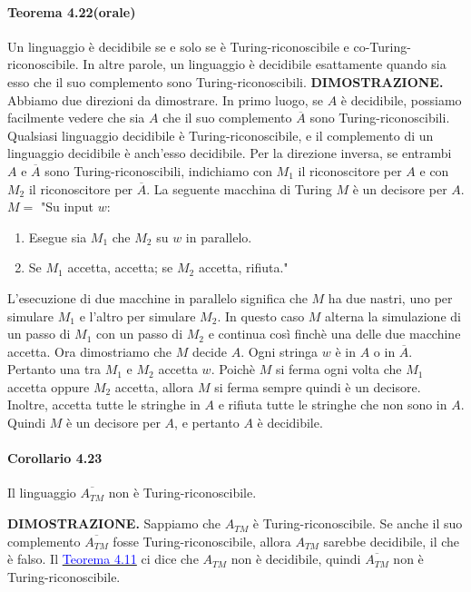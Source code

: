 \documentclass{article}
\begin{document}
\paragraph{Teorema 4.22(orale)}
\label{teorema-4.22}
\text{}
\newline
Un linguaggio è decidibile se e solo se è Turing-riconoscibile e co-Turing-riconoscibile.
\newline
In altre parole, un linguaggio è decidibile esattamente quando sia esso che il suo complemento sono Turing-riconoscibili.
\vspace{1em}
\text{}
\newline
\hbox{\textbf{DIMOSTRAZIONE.}}
Abbiamo due direzioni da dimostrare.
In primo luogo, se $A$ è decidibile, possiamo facilmente vedere che sia $A$ che il suo complemento $\overline{A}$ sono Turing-riconoscibili.
Qualsiasi linguaggio decidibile è Turing-riconoscibile, e il complemento di un linguaggio decidibile è anch'esso decidibile.
Per la direzione inversa, se entrambi $A$ e $\overline{A}$ sono Turing-riconoscibili, indichiamo con $M_1$ il riconoscitore per $A$ e con $M_2$ il riconoscitore per $\overline{A}$.
La seguente macchina di Turing $M$ è un decisore per $A$.
\vspace{1em}
\text{}
\newline
$M = $ "Su input $w$:
\begin{enumerate}
    \item Esegue sia $M_1$ che $M_2$ su $w$ in parallelo.
    \item Se $M_1$ accetta, accetta; se $M_2$ accetta, rifiuta."
\end{enumerate}
L'esecuzione di due macchine in parallelo significa che $M$ ha due nastri, uno per simulare $M_1$ e l'altro per simulare $M_2$.
In questo caso $M$ alterna la simulazione di un passo di $M_1$ con un passo di $M_2$ e continua così finchè una delle due macchine accetta.
Ora dimostriamo che $M$ decide $A$.
Ogni stringa $w$ è in $A$ o in $\overline{A}$.
Pertanto una tra $M_1$ e $M_2$ accetta $w$.
Poichè $M$ si ferma ogni volta che $M_1$ accetta oppure $M_2$ accetta, allora $M$ si ferma sempre quindi è un decisore.
Inoltre, accetta tutte le stringhe in $A$ e rifiuta tutte le stringhe che non sono in $A$.
Quindi $M$ è un decisore per $A$, e pertanto $A$ è decidibile.
\newline
\paragraph*{Corollario 4.23}
\label{corollario-4.23}
\text{}
\newline
\begin{tcolorbox}[title=Corollario 4.23]
Il linguaggio $\overline{A_{TM}}$ non è Turing-riconoscibile.
\end{tcolorbox}
\vspace{1em}
\text{}
\newline
\hbox{\textbf{DIMOSTRAZIONE.}}
Sappiamo che $A_{TM}$ è Turing-riconoscibile.
Se anche il suo complemento $\overline{A_{TM}}$ fosse Turing-riconoscibile, allora $A_{TM}$ sarebbe decidibile, il che è falso.
Il \hyperref[teorema-4.11]{\textcolor{blue}{Teorema 4.11}} ci dice che $A_{TM}$ non è decidibile, quindi $\overline{A_{TM}}$ non è Turing-riconoscibile.
\end{document}
